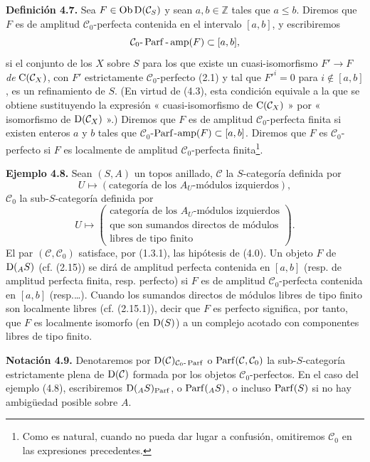 \textbf{Definición 4.7.} Sea \(F\in\operatorname{Ob}\mathrm D(\mathcal C_S)\) y sean \(a,b\in\mathbb Z\) tales que \(a\leq b\). Diremos que \(F\) es de amplitud \(\mathcal C_0\)-perfecta contenida en el intervalo \([a,b]\), y escribiremos
\[
  \mathcal C_0\text{-}\operatorname{Parf}\text{-}\operatorname{amp}(F)\subset[a,b],
\]
si el conjunto de los \(X\) sobre \(S\) para los que existe un cuasi-isomorfismo \(F'\to F\) \emph{de} \(\mathrm C(\mathcal C_X)\), con \(F'\) estrictamente \(\mathcal C_0\)-perfecto (2.1) y tal que \(F'^i=0\) para \(i\notin[a,b]\), es un refinamiento de \(S\). (En virtud de (4.3), esta condición equivale a la que se obtiene sustituyendo la expresión « cuasi-isomorfismo de \(\mathrm C(\mathcal C_X)\) » por « isomorfismo de \(\mathrm D(\mathcal C_X)\) ».) Diremos que \(F\) es de amplitud \(\mathcal C_0\)-perfecta finita si existen enteros \(a\) y \(b\) tales que \(\mathcal C_0\)-\(\operatorname{Parf}\)-\(\operatorname{amp}(F)\subset[a,b]\). Diremos que \(F\) es \(\mathcal C_0\)-perfecto si \(F\) es localmente de amplitud \(\mathcal C_0\)-perfecta finita\footnote{Como es natural, cuando no pueda dar lugar a confusión, omitiremos \(\mathcal C_0\) en las expresiones precedentes.}.

\textbf{Ejemplo 4.8.} Sean \((S,A)\) un topos anillado, \(\mathcal C\) la \(S\)-categoría definida por
\[
  U\longmapsto (\text{categoría de los }A_U\text{-módulos izquierdos}),
\]
\(\mathcal C_0\) la sub-\(S\)-categoría definida por
\[
  U\longmapsto
  \left(
  \begin{gathered}
  \text{categoría de los }A_U\text{-módulos izquierdos}\\
  \text{que son sumandos directos de módulos}\\
  \text{libres de tipo finito}
  \end{gathered}
  \right).
\]
El par \((\mathcal C,\mathcal C_0)\) satisface, por (1.3.1), las hipótesis de (4.0). Un objeto \(F\) de \(\mathrm D(_A S)\) (cf. (2.15)) se dirá de amplitud perfecta contenida en \([a,b]\) (resp. de amplitud perfecta finita, resp. perfecto) si \(F\) es de amplitud \(\mathcal C_0\)-perfecta contenida en \([a,b]\) (resp.\dots). Cuando los sumandos directos de módulos libres de tipo finito son localmente libres (cf. (2.15.1)), decir que \(F\) es perfecto significa, por tanto, que \(F\) es localmente isomorfo (en \(\mathrm D(S)\)) a un complejo acotado con componentes libres de tipo finito.

\textbf{Notación 4.9.} Denotaremos por \(\mathrm D(\mathcal C)_{\mathcal C_0\text{-}\operatorname{Parf}}\) o \(\operatorname{Parf}(\mathcal C,\mathcal C_0)\) la sub-\(S\)-categoría estrictamente plena de \(\mathrm D(\mathcal C)\) formada por los objetos \(\mathcal C_0\)-perfectos. En el caso del ejemplo (4.8), escribiremos \(\mathrm D(_A S)_{\operatorname{Parf}}\), o \(\operatorname{Parf}(_A S)\), o incluso \(\operatorname{Parf}(S)\) si no hay ambigüedad posible sobre \(A\).
